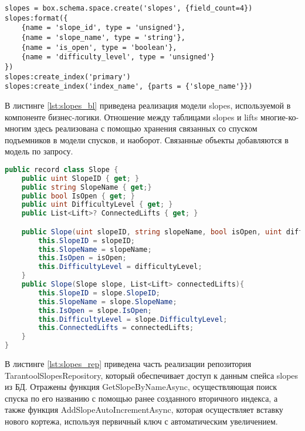 \captionsetup{justification=centering,singlelinecheck=off}
\begin{lstlisting}[label=lst:slopes_tarantool, caption=Создание спейса slopes, style=myLuastyle]
slopes = box.schema.space.create('slopes', {field_count=4})
slopes:format({
	{name = 'slope_id', type = 'unsigned'},
	{name = 'slope_name', type = 'string'},
	{name = 'is_open', type = 'boolean'},
	{name = 'difficulty_level', type = 'unsigned'}
})
slopes:create_index('primary')
slopes:create_index('index_name', {parts = {'slope_name'}})
\end{lstlisting}

В листинге \ref{lst:slopes_bl} приведена реализация модели slopes, используемой в компоненте бизнес-логики. Отношение между таблицами slopes и lifts многие-ко-многим здесь реализована с помощью хранения связанных со спуском подъемников в модели спусков, и наоборот. Связанные объекты добавляются в модель по запросу.

\captionsetup{justification=centering,singlelinecheck=off}
\begin{lstlisting}[label=lst:slopes_bl, caption=Модель базы данных на примере таблицы slopes, language=csharp]
public record class Slope {
	public uint SlopeID { get; }
	public string SlopeName { get;}
	public bool IsOpen { get; }
	public uint DifficultyLevel { get; }
	public List<Lift>? ConnectedLifts { get; }

	public Slope(uint slopeID, string slopeName, bool isOpen, uint difficultyLevel){
		this.SlopeID = slopeID;
		this.SlopeName = slopeName;
		this.IsOpen = isOpen;
		this.DifficultyLevel = difficultyLevel;
	}
	public Slope(Slope slope, List<Lift> connectedLifts){
		this.SlopeID = slope.SlopeID;
		this.SlopeName = slope.SlopeName;
		this.IsOpen = slope.IsOpen;
		this.DifficultyLevel = slope.DifficultyLevel;
		this.ConnectedLifts = connectedLifts;
	}
}
\end{lstlisting}

В листинге \ref{lst:slopes_rep} приведена часть реализации репозитория \\TarantoolSlopesRepository, который обеспечивает доступ к данным спейса slopes из БД. Отражены функция GetSlopeByNameAsync, осуществляющая поиск спуска по его названию с помощью ранее созданного вторичного индекса, а также функция AddSlopeAutoIncrementAsync, которая осуществляет вставку нового кортежа, используя первичный ключ с автоматическим увеличением.

